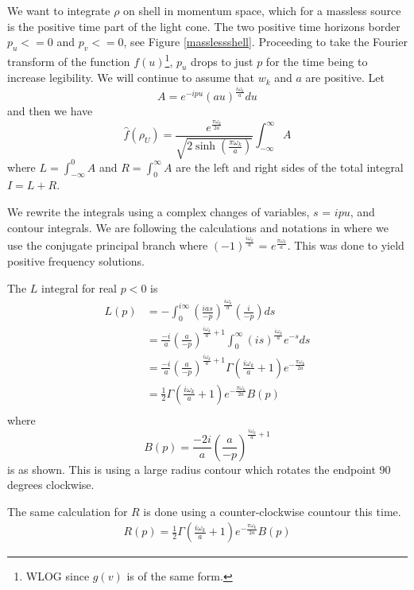 \documentclass[12pt,a4paper]{article}
\begin{document}
We want to integrate $\rho$ on shell in momentum space, which for a massless source is the positive time part of the light cone.  The two positive time horizons border $p_u <= 0$ and $p_v <= 0$, see Figure \ref{masslessshell}.  Proceeding to take the Fourier transform of the function $f(u)$\footnote{WLOG since $g(v)$ is of the same form.}, $p_u$ drops to just $p$ for the time being to increase legibility.  We will continue to assume that $w_k$ and $a$ are positive. Let
\[
  A = e^{-i p u} (au)^\frac{i\omega_k}{a} du
\]
and then we have
\begin{equation}
\label{finalnorm}
  \hat{f}(\rho_U) =  \frac{e^{\frac{\pi \omega_k}{2a}}}{\sqrt{2 \sinh \left({\frac{\pi\omega_k}{a}}\right)}}  \int_{-\infty}^\infty A
\end{equation}
where $L=\int_{-\infty}^0 A$ and $R=\int_0^\infty A$ are the left and right sides of the total integral $I = L + R$.

We rewrite the integrals using a complex changes of variables, $s$ = $ipu$, and contour integrals.  We are following the calculations and notations in \cite{Frodden} where we use the conjugate principal branch where $(-1)^\frac{i\omega_k}{a}$ = $e^\frac{\pi \omega_k}{a}$.   This was done to yield positive frequency solutions.

The $L$ integral for real $p<0$ is
\[
\begin{split}
  L(p) & = -\int_0^{i\infty} \left(\frac{ias}{-p}\right)^\frac{i\omega_k}{a} \left(\frac{i}{-p}\right)ds \\
  & = \frac{-i}{a} \left(\frac{a}{-p}\right)^{\frac{i\omega_k}{a} + 1} \int_0^\infty \left(is\right) ^ \frac{i\omega_k}{a} e^{-s} ds \\
  & = \frac{-i}{a} \left(\frac{a}{-p}\right)^{\frac{i\omega_k}{a} + 1} \Gamma\left(\frac{i\omega_k}{a} + 1\right) e^{-\frac{\pi \omega_k}{2a}} \\
  & = \frac{1}{2} \Gamma\left(\frac{i\omega_k}{a} + 1\right) e^{-\frac{\pi \omega_k}{2a}} B(p)\\
\end{split}
\]
where
\[
B(p) = \frac{-2i}{a} \left(\frac{a}{-p}\right)^{\frac{i\omega_k}{a} + 1} 
\]
is as shown.  This is using a large radius contour which rotates the endpoint 90 degrees clockwise.  

The same calculation for $R$ is done using a counter-clockwise countour this time.
\[
\begin{split}
  R(p) = \frac{1}{2}\Gamma\left(\frac{i\omega_k}{a} + 1\right) e^{-\frac{\pi \omega_k}{2a}} B(p)
\end{split}
\]
\end{document}
